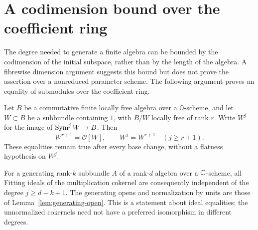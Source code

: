 \section{A codimension bound over the coefficient ring}
\label{sec:codimension-stabilization}
The degree needed to generate a finite algebra can be bounded by the
codimension of the initial subspace, rather than by the length of the
algebra. A fibrewise dimension argument suggests this bound but does
not prove the assertion over a nonreduced parameter scheme. The
following argument proves an equality of submodules over the
coefficient ring.

\begin{theorem}
\label{thm:codimension-stabilization}
Let $B$ be a commutative finite locally free algebra over a
$\mathbb Q$-scheme, and let $W\subset B$ be a subbundle containing
$1$, with $B/W$ locally free of rank $r$. Write $W^j$ for the image
of $\operatorname{Sym}^j W\to B$. Then
\begin{equation}\label{eq:codimension-stabilization}
 W^{r+1}=\mathcal O[W],\qquad W^j=W^{r+1}\quad(j\ge r+1).
\end{equation}
These equalities remain true after every base change, without a
flatness hypothesis on $W^j$.

For a generating rank-$k$ subbundle $A$ of a rank-$d$ algebra over
a $\mathbb C$-scheme, all Fitting ideals of the multiplication cokernel
are consequently independent of the degree $j\ge d-k+1$.
The generating opens and normalization by units are those of
Lemma~\ref{lem:generating-open}. This is a statement about ideal
equalities; the unnormalized cokernels need not have a preferred
isomorphism in different degrees.
\end{theorem}
